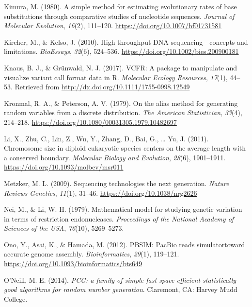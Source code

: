 \documentclass[12pt,]{article}
\begin{document}
\leavevmode\hypertarget{ref-Kimura_1980}{}%
Kimura, M. (1980). A simple method for estimating evolutionary rates of
base substitutions through comparative studies of nucleotide sequences.
\emph{Journal of Molecular Evolution}, \emph{16}(2), 111--120.
\url{https://doi.org/10.1007/bf01731581}

\leavevmode\hypertarget{ref-Kircher_2010}{}%
Kircher, M., \& Kelso, J. (2010). High-throughput DNA sequencing -
concepts and limitations. \emph{BioEssays}, \emph{32}(6), 524--536.
\url{https://doi.org/10.1002/bies.200900181}

\leavevmode\hypertarget{ref-Knaus_2017}{}%
Knaus, B. J., \& Grünwald, N. J. (2017). VCFR: A package to manipulate
and visualize variant call format data in R. \emph{Molecular Ecology
Resources}, \emph{17}(1), 44--53. Retrieved from
\url{http://dx.doi.org/10.1111/1755-0998.12549}

\leavevmode\hypertarget{ref-Kronmal_1979}{}%
Kronmal, R. A., \& Peterson, A. V. (1979). On the alias method for
generating random variables from a discrete distribution. \emph{The
American Statistician}, \emph{33}(4), 214--218.
\url{https://doi.org/10.1080/00031305.1979.10482697}

\leavevmode\hypertarget{ref-Li_2011}{}%
Li, X., Zhu, C., Lin, Z., Wu, Y., Zhang, D., Bai, G., \ldots{} Yu, J.
(2011). Chromosome size in diploid eukaryotic species centers on the
average length with a conserved boundary. \emph{Molecular Biology and
Evolution}, \emph{28}(6), 1901--1911.
\url{https://doi.org/10.1093/molbev/msr011}

\leavevmode\hypertarget{ref-Metzker_2009}{}%
Metzker, M. L. (2009). Sequencing technologies the next generation.
\emph{Nature Reviews Genetics}, \emph{11}(1), 31--46.
\url{https://doi.org/10.1038/nrg2626}

\leavevmode\hypertarget{ref-Nei}{}%
Nei, M., \& Li, W. H. (1979). Mathematical model for studying genetic
variation in terms of restriction endonucleases. \emph{Proceedings of
the National Academy of Sciences of the USA}, \emph{76}(10), 5269--5273.

\leavevmode\hypertarget{ref-Ono_2012}{}%
Ono, Y., Asai, K., \& Hamada, M. (2012). PBSIM: PacBio reads
simulatortoward accurate genome assembly. \emph{Bioinformatics},
\emph{29}(1), 119--121.
\url{https://doi.org/10.1093/bioinformatics/bts649}

\leavevmode\hypertarget{ref-Oneill_2014pcg}{}%
O'Neill, M. E. (2014). \emph{PCG: a family of simple fast
space-efficient statistically good algorithms for random number
generation}. Claremont, CA: Harvey Mudd College.
\end{document}
